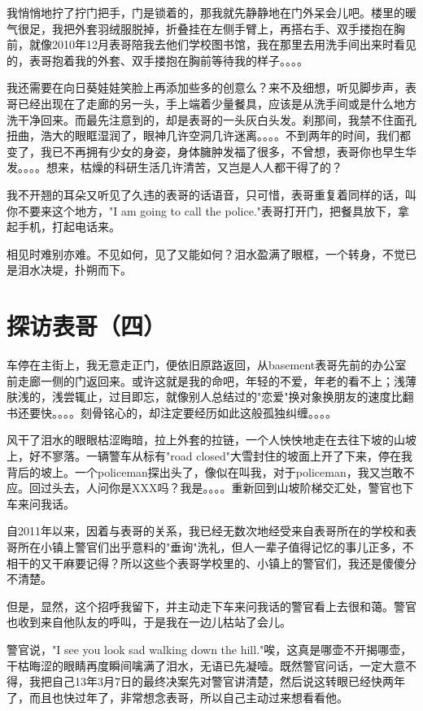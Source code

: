 \documentclass[12pt]{book}
\begin{document}
我悄悄地拧了拧门把手，门是锁着的，那我就先静静地在门外呆会儿吧。楼里的暖气很足，我把外套羽绒服脱掉，折叠挂在左侧手臂上，再搭右手、双手搂抱在胸前，就像2010年12月表哥陪我去他们学校图书馆，我在那里去用洗手间出来时看见的，表哥抱着我的外套、双手搂抱在胸前等待我的样子。。。。

我还需要在向日葵娃娃笑脸上再添加些多的创意么？来不及细想，听见脚步声，表哥已经出现在了走廊的另一头，手上端着少量餐具，应该是从洗手间或是什么地方洗干净回来。而最先注意到的，却是表哥的一头灰白头发。刹那间，我禁不住面孔扭曲，浩大的眼眶湿润了，眼神几许空洞几许迷离。。。。不到两年的时间，我们都变了，我已不再拥有少女的身姿，身体臃肿发福了很多，不曾想，表哥你也早生华发。。。。想来，枯燥的科研生活几许清苦，又岂是人人都干得了的？

我不开翘的耳朵又听见了久违的表哥的话语音，只可惜，表哥重复着同样的话，叫你不要来这个地方，"I am going to call the police."表哥打开门，把餐具放下，拿起手机，打起电话来。

相见时难别亦难。不见如何，见了又能如何？泪水盈满了眼框，一个转身，不觉已是泪水决堤，扑朔而下。
\section{探访表哥（四）}
\label{sec-37-4}
车停在主街上，我无意走正门，便依旧原路返回，从basement表哥先前的办公室前走廊一侧的门返回来。或许这就是我的命吧，年轻的不爱，年老的看不上；浅薄肤浅的，浅尝辄止，过目即忘，就像别人总结过的"恋爱"换对象换朋友的速度比翻书还要快。。。。刻骨铭心的，却注定要经历如此这般孤独纠缠。。。。

风干了泪水的眼眼枯涩晦暗，拉上外套的拉链，一个人怏怏地走在去往下坡的山坡上，好不寥落。一辆警车从标有"road closed"大雪封住的坡面上开了下来，停在我背后的坡上。一个policeman探出头了，像似在叫我，对于policeman，我又岂敢不应。回过头去，人问你是XXX吗？我是。。。。重新回到山坡阶梯交汇处，警官也下车来问我话。

自2011年以来，因着与表哥的关系，我已经无数次地经受来自表哥所在的学校和表哥所在小镇上警官们出乎意料的"垂询"洗礼，但人一辈子值得记忆的事儿正多，不相干的又干麻要记得？所以这些个表哥学校里的、小镇上的警官们，我还是傻傻分不清楚。

但是，显然，这个招呼我留下，并主动走下车来问我话的警官看上去很和蔼。警官也收到来自他队友的呼叫，于是我在一边儿枯站了会儿。

警官说，"I see you look sad walking down the hill."唉，这真是哪壶不开揭哪壶，干枯晦涩的眼睛再度瞬间噙满了泪水，无语已先凝噎。既然警官问话，一定大意不得，我把自己13年3月7日的最终决案先对警官讲清楚，然后说这转眼已经快两年了，而且也快过年了，非常想念表哥，所以自己主动过来想看看他。
\end{document}
